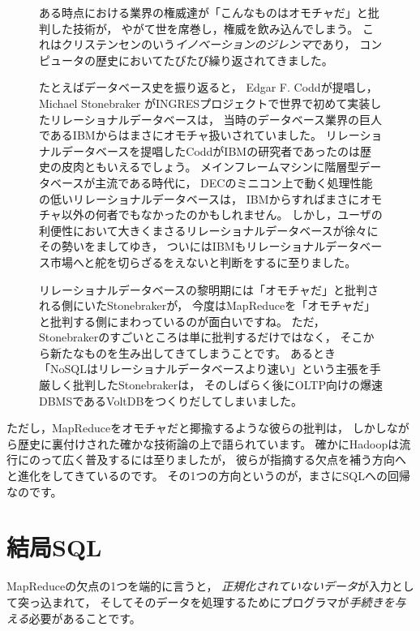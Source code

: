 \begin{figure}[t]
\begin{screen}
 \vspace*{3mm}

 ある時点における業界の権威達が「こんなものはオモチャだ」と批判した技術が，
 やがて世を席巻し，権威を飲み込んでしまう。
 これはクリステンセンのいう{\em イノベーションのジレンマ}であり，
 コンピュータの歴史においてたびたび繰り返されてきました。

 たとえばデータベース史を振り返ると，
 Edgar F. Coddが提唱し，
 Michael Stonebraker がINGRESプロジェクトで世界で初めて実装したリレーショナルデータベースは，
 当時のデータベース業界の巨人であるIBMからはまさにオモチャ扱いされていました。
 リレーショナルデータベースを提唱したCoddがIBMの研究者であったのは歴史の皮肉ともいえるでしょう。
 メインフレームマシンに階層型データベースが主流である時代に，
 DECのミニコン上で動く処理性能の低いリレーショナルデータベースは，
 IBMからすればまさにオモチャ以外の何者でもなかったのかもしれません。
 しかし，ユーザの利便性において大きくまさるリレーショナルデータベースが徐々にその勢いをましてゆき，
 ついにはIBMもリレーショナルデータベース市場へと舵を切らざるをえないと判断をするに至りました。

 リレーショナルデータベースの黎明期には「オモチャだ」と批判される側にいたStonebrakerが，
 今度はMapReduceを「オモチャだ」と批判する側にまわっているのが面白いですね。
 ただ，Stonebrakerのすごいところは単に批判するだけではなく，
 そこから新たなものを生み出してきてしまうことです。
 あるとき「NoSQLはリレーショナルデータベースより速い」という主張を手厳しく批判したStonebrakerは，
 そのしばらく後にOLTP向けの爆速DBMSであるVoltDBをつくりだしてしまいました。
\end{screen}
\end{figure}

ただし，MapReduceをオモチャだと揶揄するような彼らの批判は，
しかしながら歴史に裏付けされた確かな技術論の上で語られています。
確かにHadoopは流行にのって広く普及するには至りましたが，
彼らが指摘する欠点を補う方向へと進化をしてきているのです。
その1つの方向というのが，まさにSQLへの回帰なのです。

\section{結局SQL}

MapReduceの欠点の1つを端的に言うと，
{\em 正規化されていないデータ}が入力として突っ込まれて，
そしてそのデータを処理するためにプログラマが{\em 手続きを与える}必要があることです。


